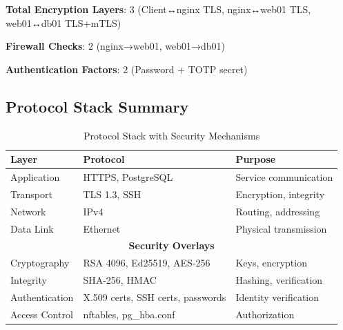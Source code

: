 \textbf{Total Encryption Layers}: 3 (Client↔nginx TLS, nginx↔web01 TLS, web01↔db01 TLS+mTLS)

\textbf{Firewall Checks}: 2 (nginx→web01, web01→db01)

\textbf{Authentication Factors}: 2 (Password + TOTP secret)

\subsection{Protocol Stack Summary}

\begin{table}[H]
\centering
\begin{tabular}{lll}
\toprule
\textbf{Layer} & \textbf{Protocol} & \textbf{Purpose} \\
\midrule
Application & HTTPS, PostgreSQL & Service communication \\
Transport & TLS 1.3, SSH & Encryption, integrity \\
Network & IPv4 & Routing, addressing \\
Data Link & Ethernet & Physical transmission \\
\midrule
\multicolumn{3}{c}{\textbf{Security Overlays}} \\
\midrule
Cryptography & RSA 4096, Ed25519, AES-256 & Keys, encryption \\
Integrity & SHA-256, HMAC & Hashing, verification \\
Authentication & X.509 certs, SSH certs, passwords & Identity verification \\
Access Control & nftables, pg\_hba.conf & Authorization \\
\bottomrule
\end{tabular}
\caption{Protocol Stack with Security Mechanisms}
\end{table}
